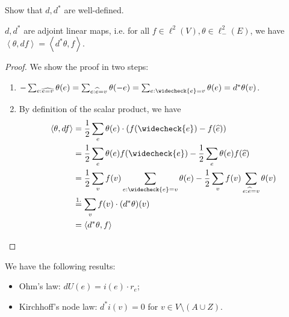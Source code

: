 \begin{exer}[]
    Show that $d,d^*$ are well-defined.
\end{exer}

\begin{lem}[]
    \(d,d^*\) are adjoint linear maps, i.e. for all \(f \in \ell^2(V), \theta \in \ell^2_{-}(E)\), we have \( \left\langle \theta, df \right\rangle = \left\langle d^*\theta, f \right\rangle  \).
\end{lem}

\begin{proof}
    We show the proof in two steps:
    \begin{enumerate}[]
      \item \(- \sum_{e: \widehat{e=v}}\theta(e) = \sum_{e: \widehat{e}=v} \theta(-e) = \sum_{e: \widecheck{e}=v} \theta(e) = d^*\theta(v)\).
      \item By definition of the scalar product, we have
        \begin{align*}
          \left\langle \theta,df \right\rangle &= \frac{1}{2}\sum_e \theta(e) \cdot \left(f( \widecheck{e})- f( \widehat{e}) \right) \\
                                               &=\frac{1}{2}\sum_e \theta(e) f( \widecheck{e}) - \frac{1}{2} \sum_e \theta(e) f( \widehat{e}) \\
                                               &=\frac{1}{2}\sum_v f(v) \sum_{e: \widecheck{e}=v}\theta(e) - \frac{1}{2} \sum_v f(v)\sum_{e: \widehat{e}=v} \theta(v) \\
                                               &\overset{\mathclap{1.}}{=} \sum_v f(v)\cdot(d^*\theta)(v) \\
                                               &= \left\langle d^*\theta, f \right\rangle 
        \end{align*}
    \end{enumerate}
    
\end{proof}


\begin{remark}[]
    We have the following results:
    \begin{itemize}
      \item Ohm's law:  \(dU(e) = i(e)\cdot r_{e}\);
      \item Kirchhoff's node law: \(d^*i(v) = 0\) for \(v \in V \setminus (A \cup Z)\).
    \end{itemize}
    
\end{remark}

